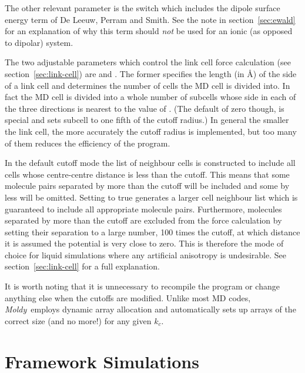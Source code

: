 \documentclass[a4paper,twoside]{report}
\newcommand{\moldy}{\emph{Moldy}}
\begin{document}
The other relevant parameter is the switch  which
includes the dipole surface energy term of De Leeuw, Perram and
Smith\cite{deleeuw:80}.  See the note in section~\ref{sec:ewald} for an
explanation of why this term should \emph{not} be used for an ionic
(as opposed to dipolar) system.

The two adjustable parameters which control the link cell force
calculation (see section~\ref{sec:link-cell}) are  and
. The former specifies the length (in {\AA}) of the side of
a link cell and determines the number of cells the MD cell is divided
into. In fact the MD cell is divided into a whole number of subcells
whose side in each of the three directions is nearest to the value of
.  (The default of zero though, is special and sets
subcell to one fifth of the cutoff radius.)  In general the smaller
the link cell, the more accurately the cutoff radius is implemented,
but too many of them reduces the efficiency of the program.

In the default cutoff mode  the list of
neighbour cells is constructed to include all cells whose
centre-centre distance is less than the cutoff.  This means that some
molecule pairs separated by more than the cutoff will be included and
some by less will be omitted.  Setting  to true
generates a larger cell neighbour list which is guaranteed to include
all appropriate molecule pairs.  Furthermore, molecules separated by
more than the cutoff are excluded from the force calculation by
setting their separation to a large number, 100 times the cutoff, at
which distance it is assumed the potential is very close to zero.
This is therefore the mode of choice for liquid simulations where any
artificial anisotropy is undesirable.  See section~\ref{sec:link-cell}
for a full explanation.

It is worth noting that it is unnecessary to recompile the program or
change anything else when the cutoffs are modified. Unlike most MD
codes, \moldy\ employs dynamic array allocation and automatically sets
up arrays of the correct size (and no more!) for any given $k_{c}$.

\section{Framework Simulations}%
\end{document}
